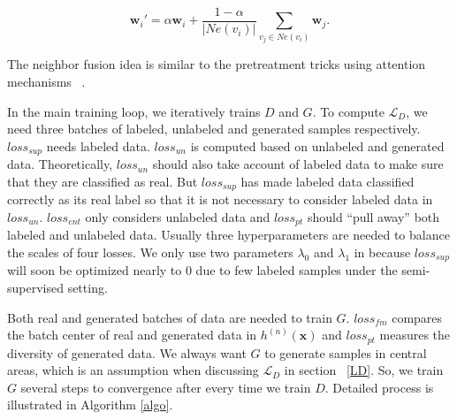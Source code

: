 \begin{equation}\label{neighbor_fusion}
\mathbf{w}_i' = \alpha \mathbf{w}_i + \frac{1-\alpha}{|Ne(v_i)|}\sum\limits_{v_j \in Ne(v_i)} \mathbf{w}_j.
\end{equation}

The neighbor fusion idea is similar to the pretreatment tricks using attention mechanisms
~\cite{DBLP:journals/corr/abs-1710-10903}.

In the main training loop, we iteratively trains $D$ and $G$. 
To compute $\mathcal{L}_D$, we need three batches of labeled, unlabeled and generated samples respectively. $loss_{sup}$ needs labeled data. $loss_{un}$ is computed based on unlabeled and generated data. Theoretically, $loss_{un}$ should also take account of labeled data to make sure that they are classified as real. But $loss_{sup}$ has made labeled data classified correctly as its real label so that it is not necessary to consider labeled data in $loss_{un}$. $loss_{ent}$ only considers unlabeled data and $loss_{pt}$ should ``pull away'' both labeled and unlabeled data. 
Usually three hyperparameters are needed to balance the scales of four losses. We only use two parameters $\lambda_0$ and $\lambda_1$ in \smodel because $loss_{sup}$ will soon be optimized nearly to 0 due to few labeled samples under the semi-supervised setting.

Both real and generated batches of data are needed to train $G$. $loss_{fm}$ compares the batch center of real and generated data in $h^{(n)}(\mathbf{x})$ and $loss_{pt}$ measures the diversity of generated data. We always want $G$ to generate samples in central areas, which is an assumption when discussing $\mathcal{L}_D$ in section ~\ref{LD}. So, we train $G$ several steps to convergence after every time we train $D$. 
%
Detailed process is illustrated in Algorithm \ref{algo}.



